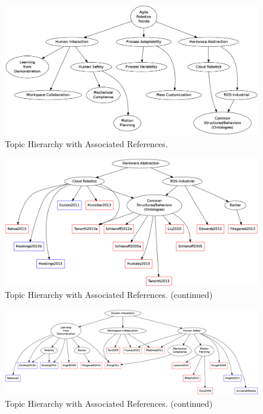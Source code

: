 \begin{figure}[!htb]
\begin{center}
        \includegraphics[width=1.0\linewidth]{Figures/topics1.png}
\caption{Topic Hierarchy with Associated References.}
\label{fig:refGraph}
\end{center}
\end{figure}
\begin{figure}[!htb]
\begin{center}
        \includegraphics[width=1.0\linewidth]{Figures/topics2.png}
\caption{Topic Hierarchy with Associated References. (continued)}
\label{fig:refGraphA}
\end{center}
\end{figure}
\begin{figure}[!htb]
\begin{center}
        \includegraphics[width=1.0\linewidth]{Figures/topics3.png}
\caption{Topic Hierarchy with Associated References. (continued)}
\label{fig:refGraphB}
\end{center}
\end{figure}

